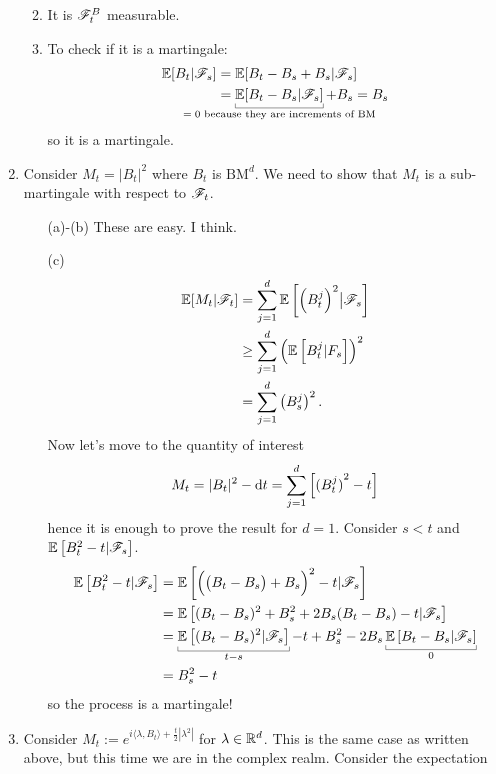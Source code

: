 \documentclass[12pt]{report}
\begin{document}
\begin{fancyproof}
\begin{enumerate}
\begin{enumerate}
\begin{insult}
		\end{insult}
		\item It is $\mathscr{F}_{t}^{B}$ measurable.
		\item To check if it is a martingale: 
		\begin{align*}
			\evs[B_{t}|\F_{s}]&=\evs[B_{t}-B_{s}+B_{s}|\F_{s}]\\
			&=\ubracketthin{\evs[B_{t}-B_{s}|\F_{s}]}_{\claptext{$= 0$ because they are increments of BM}}+B_{s}=B_{s}
		\end{align*}
		so it is a martingale.
	\end{enumerate}
	\item Consider $M_{t}=|B_{t}|^{2}$ where $B_{t}$ is $\mathrm{BM}^{d}$. We need to show that $M_{t}$ is a sub-martingale with respect to $\mathscr{F}_{t}$.
	\begin{enumerate}
		\item[(a)-(b)] These are easy. I think.
		\item[(c)]\begin{align*}
			\mathbb{E}[M_{t}|\mathscr{F}_{t}]&=\sum_{j=1}^{d}\mathbb{E}\left[{\left(B_{t}^{j}\right)}^{2}\big|\mathscr{F}_{s}\right]\\
			&\geq\sum_{j=1}^{d}\left(\mathbb{E}\left[B^{j}_{t}|F_{s}\right]\right)^{2}\\
			&=\sum_{j=1}^{d}\left(B^{j}_{s}\right)^{2}.
		\end{align*}
		Now let's move to the quantity of interest
		\begin{equation*}
			M_{t}=|B_{t}|^{2}-\mathop{}\!\mathrm{d} t=\sum_{j=1}^{d}\left[{(B^{j}_{t})}^{2}-t\right]
		\end{equation*}
		hence it is enough to prove the result for $d=1$. Consider $s<t$ and $\mathbb{E}\left[B^{2}_{t}-t|\mathscr{F}_{s}\right]$.
		\begin{align*}
			\evs\left[B^{2}_{t}-t|\F_{s}\right]&=\evs\left[\Bigl(\bigl(B_{t}-B_{s}\bigr)+B_{s}\Bigr)^{2}-t|\F_{s}\right]\\
			&=\evs\left[(B_{t}-B_{s})^{2}+B_{s}^{2}+2B_{s}(B_{t}-B_{s})-t|\F_{s}\right]\\
			&=\ubracketthin{\evs\left[(B_{t}-B_{s})^{2}|\F_{s}\right]}_{t-s}-t+B_{s}^{2}-2B_{s}\ubracketthin{\evs\left[B_{t}-B_{s}|\F_{s}\right]}_{0}\\
			&=B_{s}^{2}-t
		\end{align*}
		so the process is a martingale!
	\end{enumerate}
	\item Consider $M_{t}:=e^{i\langle\lambda,B_{t}\rangle+\frac{t}{2}|\lambda^{2}|}$ for $\lambda\in\mathbb{R}^{d}$. This is the same case as written above, but this time we are in the complex realm. Consider the expectation

\end{enumerate}
\end{fancyproof}
\end{document}
